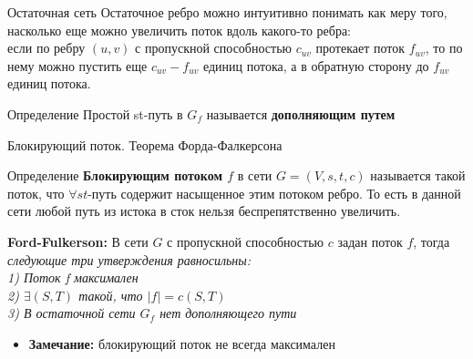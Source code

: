 \documentclass{beamer}
\begin{document}
\begin{frame}{Остаточная сеть}
Остаточное ребро можно интуитивно понимать как меру того, насколько еще можно увеличить поток вдоль какого-то ребра:\\ если по ребру $(u, v)$ с пропускной способностью $c_{uv}$ протекает поток $f_{uv}$, то по нему можно пустить еще $c_{uv} - f_{uv}$ единиц потока, а в обратную сторону до $f_{uv}$ единиц потока.
\begin{exampleblock}{Определение}
Простой st-путь в $G_{f}$ называется \textbf{дополняющим путем}
\end{exampleblock}
\end{frame}

\begin{frame}{Блокирующий поток. Теорема Форда-Фалкерсона}
    \begin{exampleblock}{Определение}
        \textbf{Блокирующим потоком $f$} в сети $G = (V, s, t, c)$ называется такой поток, что $\forall st$-путь содержит насыщенное этим потоком ребро. То есть в данной сети любой путь из истока в сток нельзя беспрепятственно увеличить.
    \end{exampleblock}
    \pause
    \begin{theorem}
        \textbf{Ford-Fulkerson:} В сети $G$ с пропускной способностью $c$ задан поток $f$, тогда \textit{следующие три утверждения равносильны:\\
        1) Поток f максимален\\
        2) $\exists (S, T)$ такой, что $|f| = c(S, T)$\\
        3) В остаточной сети $G_f$ нет дополняющего пути
        }
    \end{theorem}
    \begin{itemize}
        \item \textbf{Замечание: } блокирующий поток не всегда максимален
    \end{itemize}
\end{frame}
\end{document}
